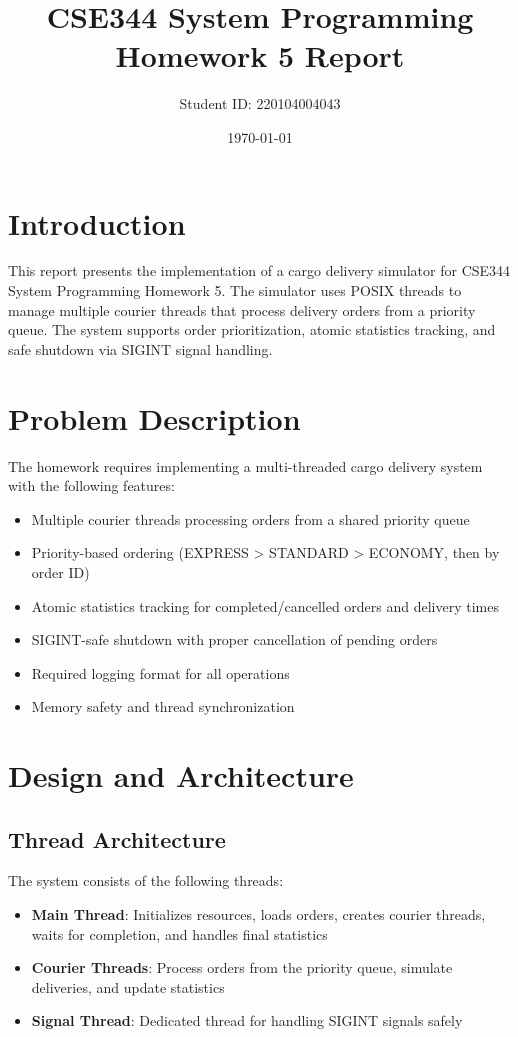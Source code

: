 \documentclass[12pt,a4paper]{article}
\title{CSE344 System Programming Homework 5 Report}
\author{Student ID: 220104004043}
\date{\today}
\begin{document}
\maketitle

\section{Introduction}

This report presents the implementation of a cargo delivery simulator for CSE344 System Programming Homework 5. The simulator uses POSIX threads to manage multiple courier threads that process delivery orders from a priority queue. The system supports order prioritization, atomic statistics tracking, and safe shutdown via SIGINT signal handling.

\section{Problem Description}

The homework requires implementing a multi-threaded cargo delivery system with the following features:

\begin{itemize}
    \item Multiple courier threads processing orders from a shared priority queue
    \item Priority-based ordering (EXPRESS > STANDARD > ECONOMY, then by order ID)
    \item Atomic statistics tracking for completed/cancelled orders and delivery times
    \item SIGINT-safe shutdown with proper cancellation of pending orders
    \item Required logging format for all operations
    \item Memory safety and thread synchronization
\end{itemize}

\section{Design and Architecture}

\subsection{Thread Architecture}

The system consists of the following threads:

\begin{itemize}
    \item \textbf{Main Thread}: Initializes resources, loads orders, creates courier threads, waits for completion, and handles final statistics
    \item \textbf{Courier Threads}: Process orders from the priority queue, simulate deliveries, and update statistics
    \item \textbf{Signal Thread}: Dedicated thread for handling SIGINT signals safely
\end{itemize}
\end{document}
